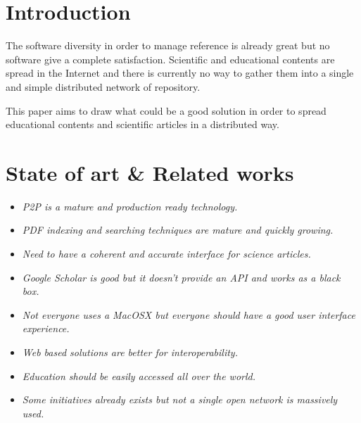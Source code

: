 \section{Introduction}

The software diversity in order to manage reference is already
great but no software give a complete satisfaction. Scientific and
educational contents are spread in the Internet and there is currently
no way to gather them into a single and simple distributed network of repository.

This paper aims to draw what could be a good solution in order to
spread educational contents and scientific articles in a distributed
way.


\section{State of art \& Related works}

\begin{itemize}

\item \textit{P2P is a mature and production ready technology.}

\item \textit{PDF indexing and searching techniques are mature and quickly growing.}

\item \textit{Need to have a coherent and accurate interface for science articles.}

\end{itemize}

\begin{itemize}

\item \textit{Google Scholar is good but it doesn't provide an API and works as a black box.}

\item \textit{Not everyone uses a MacOSX but everyone should have a good user interface experience.}

\item \textit{Web based solutions are better for interoperability.}

\item \textit{Education should be easily accessed all over the world.}

\item \textit{Some initiatives already exists but not a single open network is massively used.}

\end{itemize}


